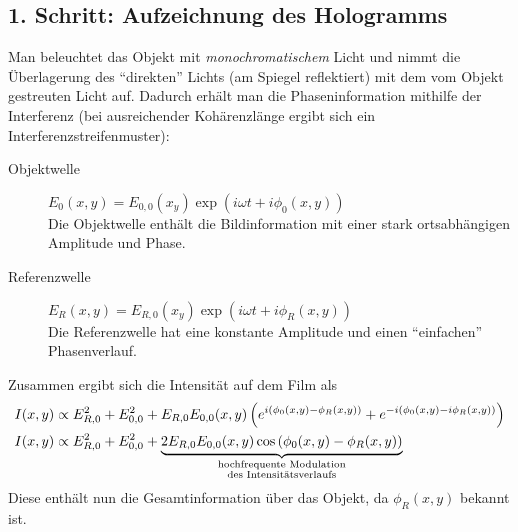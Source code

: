 \subsection*{1. Schritt: Aufzeichnung des Hologramms}%
  Man beleuchtet das Objekt mit \emph{monochromatischem} Licht und
  nimmt die Überlagerung des \enquote{direkten} Lichts (am Spiegel
  reflektiert) mit dem vom Objekt gestreuten Licht auf.
  Dadurch erhält man die Phaseninformation mithilfe der Interferenz
  (bei ausreichender Kohärenzlänge ergibt sich ein
  Interferenzstreifenmuster):
  \begin{description}
    \item[Objektwelle] 
      $\displaystyle E_0(x,y) = E_{0,0}(x_y)\exp(i\omega t+i\phi_0(x,y))$\\
      Die Objektwelle enthält die Bildinformation mit einer stark
      ortsabhängigen Amplitude und Phase.
    \item[Referenzwelle]
      $\displaystyle E_R(x,y) = E_{R,0}(x_y)\exp(i\omega t+ i\phi_R(x,y))$\\
      Die Referenzwelle hat eine konstante Amplitude und einen
      \enquote{einfachen} Phasenverlauf.
  \end{description}
  Zusammen ergibt sich die Intensität auf dem Film als
  \begin{align*}
    I(x,y) & \propto E_{R,0}^2 + E_{0,0}^2 
             + E_{R,0}E_{0,0}(x,y)\left(
             e^{i(\phi_0(x,y)-\phi_R(x,y))}
             + e^{-i(\phi_0(x,y)-i\phi_R(x,y))}
             \right)\\
    I(x,y) &\propto E_{R,0}^2 + E_{0,0}^2 
             + \underbrace{
             2E_{R,0}E_{0,0}(x,y)
             \cos\left(\phi_0(x,y)-\phi_R(x,y)\right)}_{
             \mathclap{\substack{
             \text{hochfrequente Modulation}\\
    \text{des Intensitätsverlaufs}}}
    }
  \end{align*}
  Diese enthält nun die Gesamtinformation über das Objekt, da
  $\phi_R(x,y)$ bekannt ist.


